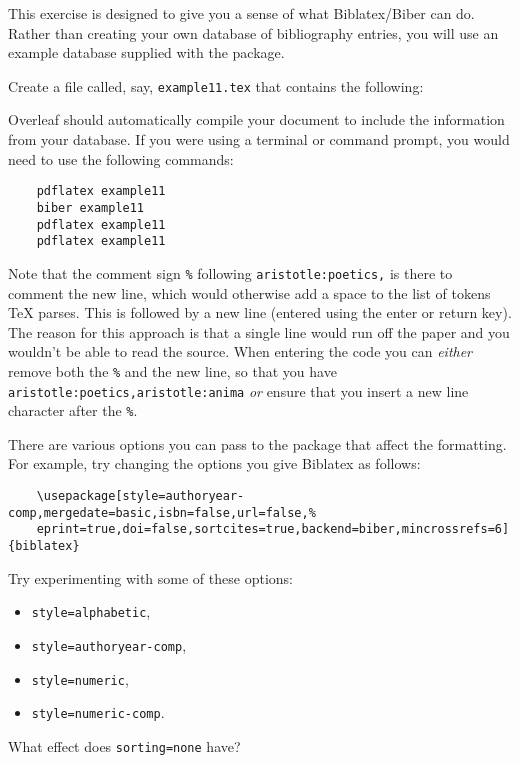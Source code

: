 \begin{exercise}\label{ex:biblatex-example}
  This exercise is designed to give you a sense of what Biblatex/Biber can do.
  Rather than creating your own database of bibliography entries, you will use an example database supplied with the  package.

  Create a file called, say, \texttt{example11.tex} that contains the following: 

  Overleaf should automatically compile your document to include the information from your database.
  If you were using a terminal or command prompt, you would need to use the following commands:
  \begin{verbatim}
    pdflatex example11
    biber example11
    pdflatex example11
    pdflatex example11
  \end{verbatim}
  Note that the comment sign \verb|%| following \verb|aristotle:poetics,| is there to comment the new line, which would otherwise add a space to the list of tokens \TeX{} parses.
  This is followed by a new line (entered using the enter or return key).
  The reason for this approach is that a single line would run off the paper and you wouldn't be able to read the source.
  When entering the code you can \emph{either} remove both the \verb|%| and the new line, so that you have \verb|aristotle:poetics,aristotle:anima| \emph{or} ensure that you insert a new line character after the \verb|%|.
  \smallskip

  There are various options you can pass to the  package that affect the formatting.
  For example, try changing the options you give Biblatex as follows:
  \begin{verbatim}
    \usepackage[style=authoryear-comp,mergedate=basic,isbn=false,url=false,%
    eprint=true,doi=false,sortcites=true,backend=biber,mincrossrefs=6]{biblatex}
  \end{verbatim}
  Try experimenting with some of these options:
  \begin{itemize}
    \item \texttt{style=alphabetic},
    \item \texttt{style=authoryear-comp},
    \item \texttt{style=numeric},
    \item \texttt{style=numeric-comp}.
  \end{itemize}
  What effect does \texttt{sorting=none} have?
\end{exercise}

